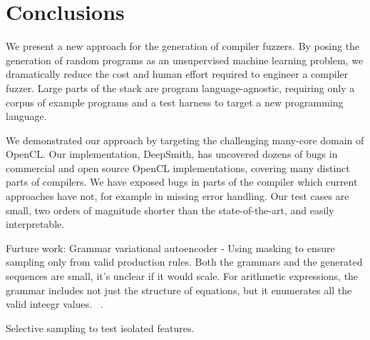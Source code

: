 \section{Conclusions}\label{sec:conclusion}

We present a new approach for the generation of compiler fuzzers. By posing the generation of random programs as an unsupervised machine learning problem, we dramatically reduce the cost and human effort required to engineer a compiler fuzzer. Large parts of the stack are program language-agnostic, requiring only a corpus of example programs and a test harness to target a new programming language.

We demonstrated our approach by targeting the challenging many-core domain of OpenCL. Our implementation, DeepSmith, has uncovered dozens of bugs in commercial and open source OpenCL implementations, covering many distinct parts of compilers. We have exposed bugs in parts of the compiler which current approaches have not, for example in missing error handling. Our test cases are small, two orders of magnitude shorter than the state-of-the-art, and easily interpretable.

Furture work: Grammar variational autoencoder - Using masking to ensure sampling only from valid production rules. Both the grammars and the generated sequences are small, it's unclear if it would scale. For arithmetic expressions, the grammar includes not just the structure of equations, but it enumerates all the valid inteegr values. ~\cite{Kusner2017}.

Selective sampling to test isolated features.